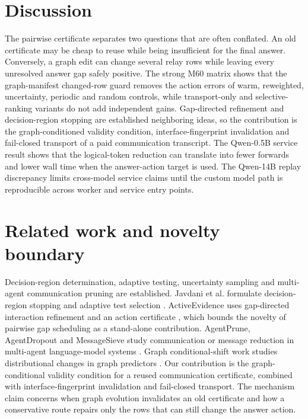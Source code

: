 \documentclass[11pt]{article}
\begin{document}
\section{Discussion}
The pairwise certificate separates two questions that are often conflated. An old certificate may be cheap to reuse while being insufficient for the final answer. Conversely, a graph edit can change several relay rows while leaving every unresolved answer gap safely positive. The strong M60 matrix shows that the graph-manifest changed-row guard removes the action errors of warm, reweighted, uncertainty, periodic and random controls, while transport-only and selective-ranking variants do not add independent gains. Gap-directed refinement and decision-region stopping are established neighboring ideas, so the contribution is the graph-conditioned validity condition, interface-fingerprint invalidation and fail-closed transport of a paid communication transcript. The Qwen-0.5B service result shows that the logical-token reduction can translate into fewer forwards and lower wall time when the answer-action target is used. The Qwen-14B replay discrepancy limits cross-model service claims until the custom model path is reproducible across worker and service entry points.

\section{Related work and novelty boundary}
Decision-region determination, adaptive testing, uncertainty sampling and multi-agent communication pruning are established. Javdani et al. formulate decision-region stopping and adaptive test selection \cite{javdani}. ActiveEvidence uses gap-directed interaction refinement and an action certificate \cite{activeevidence}, which bounds the novelty of pairwise gap scheduling as a stand-alone contribution. AgentPrune, AgentDropout and MessageSieve study communication or message reduction in multi-agent language-model systems \cite{agentprune,agentdropout,messagesieve}. Graph conditional-shift work studies distributional changes in graph predictors \cite{graces}. Our contribution is the graph-conditional validity condition for a reused communication certificate, combined with interface-fingerprint invalidation and fail-closed transport. The mechanism claim concerns when graph evolution invalidates an old certificate and how a conservative route repairs only the rows that can still change the answer action.
\end{document}
